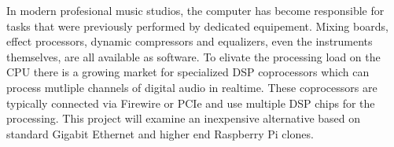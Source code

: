 In modern profesional music studios, the computer has become responsible for tasks that were previously performed by dedicated equipement. Mixing boards, effect processors, dynamic compressors and equalizers, even the instruments themselves, are all available as software. To elivate the processing load on the CPU there is a growing market for specialized DSP coprocessors which can process mutliple channels of digital audio in realtime. These coprocessors are typically connected via Firewire or PCIe and use multiple DSP chips for the processing. This project will examine an inexpensive alternative based on standard Gigabit Ethernet and higher end Raspberry Pi clones.

